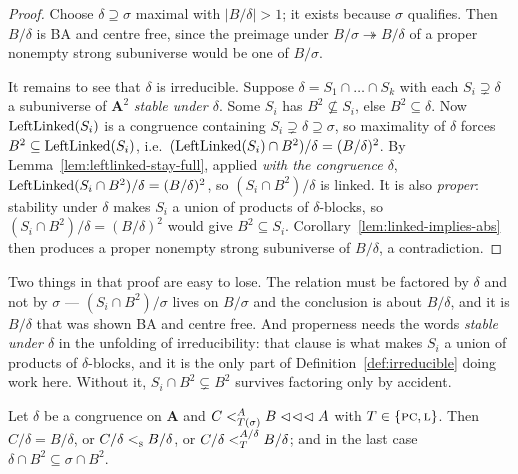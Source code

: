 \begin{proof}
Choose $\delta\supseteq\sigma$ maximal with $|B/\delta|>1$; it exists because
$\sigma$ qualifies. Then $B/\delta$ is BA and centre free, since the preimage
under $B/\sigma\twoheadrightarrow B/\delta$ of a proper nonempty strong
subuniverse would be one of $B/\sigma$.

It remains to see that $\delta$ is irreducible. Suppose
$\delta=S_{1}\cap\dots\cap S_{k}$ with each $S_{i}\supsetneq\delta$ a
subuniverse of $\mathbf A^{2}$ \emph{stable under $\delta$}. Some $S_{i}$ has
$B^{2}\not\subseteq S_{i}$, else $B^{2}\subseteq\delta$. Now
$\LeftLinked(S_{i})$ is a congruence containing
$S_{i}\supsetneq\delta\supseteq\sigma$, so maximality of $\delta$ forces
$B^{2}\subseteq\LeftLinked(S_{i})$, i.e.\
$(\LeftLinked(S_{i})\cap B^{2})/\delta=(B/\delta)^{2}$. By
Lemma~\ref{lem:leftlinked-stay-full}, applied \emph{with the congruence
$\delta$}, $\LeftLinked(S_{i}\cap B^{2})/\delta=(B/\delta)^{2}$,
so $(S_{i}\cap B^{2})/\delta$ is linked. It is also \emph{proper}: stability
under $\delta$ makes $S_{i}$ a union of products of $\delta$-blocks, so
$(S_{i}\cap B^{2})/\delta=(B/\delta)^{2}$ would give $B^{2}\subseteq S_{i}$.
Corollary~\ref{lem:linked-implies-abs} then produces a proper nonempty strong
subuniverse of $B/\delta$, a contradiction.
\end{proof}

\begin{hazard}\label{haz:main-existence}
Two things in that proof are easy to lose. The relation must be factored by
$\delta$ and not by $\sigma$ --- $(S_{i}\cap B^{2})/\sigma$ lives on $B/\sigma$
and the conclusion is about $B/\delta$, and it is $B/\delta$ that was shown BA
and centre free. And properness needs the words \emph{stable under $\delta$} in
the unfolding of irreducibility: that clause is what makes $S_{i}$ a union of
products of $\delta$-blocks, and it is the only part of
Definition~\ref{def:irreducible} doing work here. Without it,
$S_{i}\cap B^{2}\subsetneq B^{2}$ survives factoring only by accident.
\end{hazard}

\begin{lemma}\label{lem:factor-by-delta}
Let $\delta$ be a congruence on $\mathbf A$ and
$C\subt[A]{T(\sigma)}B\lll A$ with $T\in\{\TPC,\TL\}$. Then
$C/\delta=B/\delta$, or $C/\delta\subt{\TS}B/\delta$, or
$C/\delta\subt[A/\delta]{T}B/\delta$; and in the last case
$\delta\cap B^{2}\subseteq\sigma\cap B^{2}$.
\end{lemma}

